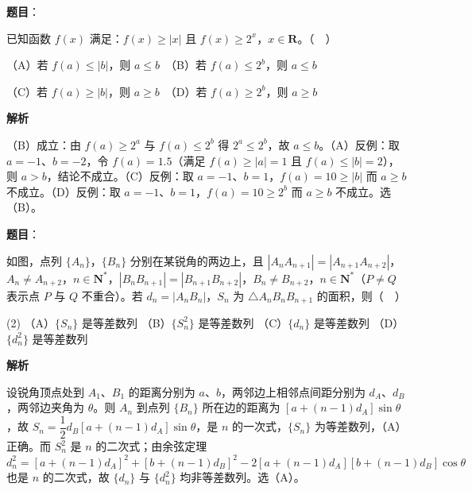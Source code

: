 \begin{answer}

\textbf{题目}：

已知函数 \(f(x)\) 满足：\(f(x)\geqslant|x|\) 且 \(f(x)\geqslant2^{x}\)，\(x\in\mathbf{R}\)。（　）

（A）若 \(f(a)\leqslant|b|\)，则 \(a\leqslant b\)　（B）若 \(f(a)\leqslant2^{b}\)，则 \(a\leqslant b\)

（C）若 \(f(a)\geqslant|b|\)，则 \(a\geqslant b\)　（D）若 \(f(a)\geqslant2^{b}\)，则 \(a\geqslant b\)

\textbf{解析}

（B）成立：由 \(f(a)\geqslant2^{a}\) 与 \(f(a)\leqslant2^{b}\) 得 \(2^{a}\leqslant2^{b}\)，故 \(a\leqslant b\)。（A）反例：取 \(a=-1\)、\(b=-2\)，令 \(f(a)=1.5\)（满足 \(f(a)\geqslant|a|=1\) 且 \(f(a)\leqslant|b|=2\)），则 \(a>b\)，结论不成立。（C）反例：取 \(a=-1\)、\(b=1\)，\(f(a)=10\geqslant|b|\) 而 \(a\geqslant b\) 不成立。（D）反例：取 \(a=-1\)、\(b=1\)，\(f(a)=10\geqslant2^{b}\) 而 \(a\geqslant b\) 不成立。选（B）。


\end{answer}
\begin{answer}

\textbf{题目}：

如图，点列 \(\{A_{n}\}\)，\(\{B_{n}\}\) 分别在某锐角的两边上，且 \(|A_{n}A_{n+1}|=|A_{n+1}A_{n+2}|\)，\(A_{n}\neq A_{n+2}\)，\(n\in\mathbf{N}^{*}\)，\(|B_{n}B_{n+1}|=|B_{n+1}B_{n+2}|\)，\(B_{n}\neq B_{n+2}\)，\(n\in\mathbf{N}^{*}\)（\(P\neq Q\) 表示点 \(P\) 与 \(Q\) 不重合）。若 \(d_{n}=|A_{n}B_{n}|\)，\(S_{n}\) 为 \(\triangle A_{n}B_{n}B_{n+1}\) 的面积，则（　）
\nopagebreak[4]
\begin{center}\end{center}
\nopagebreak[4]
\begin{gkopts}(2)
\task （A）\(\{S_{n}\}\) 是等差数列
\task （B）\(\{S_{n}^{2}\}\) 是等差数列
\task （C）\(\{d_{n}\}\) 是等差数列
\task （D）\(\{d_{n}^{2}\}\) 是等差数列
\end{gkopts}

\textbf{解析}

设锐角顶点处到 \(A_{1}\)、\(B_{1}\) 的距离分别为 \(a\)、\(b\)，两邻边上相邻点间距分别为 \(d_{A}\)、\(d_{B}\)，两邻边夹角为 \(\theta\)。则 \(A_{n}\) 到点列 \(\{B_{n}\}\) 所在边的距离为 \([a+(n-1)d_{A}]\sin\theta\)，故 \(S_{n}=\dfrac{1}{2}d_{B}[a+(n-1)d_{A}]\sin\theta\)，是 \(n\) 的一次式，\(\{S_{n}\}\) 为等差数列，（A）正确。而 \(S_{n}^{2}\) 是 \(n\) 的二次式；由余弦定理 \(d_{n}^{2}=[a+(n-1)d_{A}]^{2}+[b+(n-1)d_{B}]^{2}-2[a+(n-1)d_{A}][b+(n-1)d_{B}]\cos\theta\) 也是 \(n\) 的二次式，故 \(\{d_{n}\}\) 与 \(\{d_{n}^{2}\}\) 均非等差数列。选（A）。


\end{answer}
